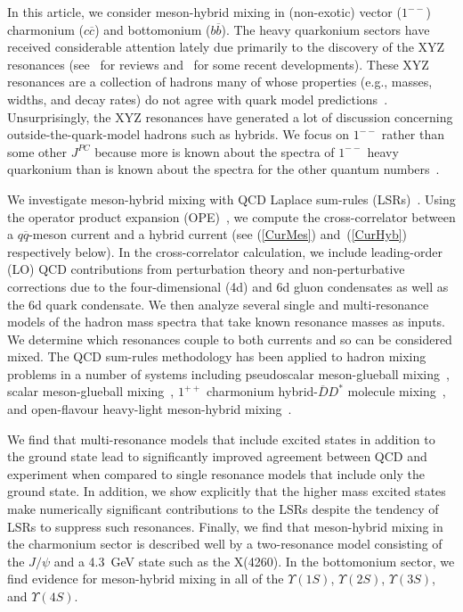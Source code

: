 \documentclass[11pt, letterpaper]{article}
\begin{document}
In this article, we consider meson-hybrid mixing in (non-exotic) vector 
($1^{--}$) charmonium ($c\overline{c}$) and bottomonium ($b\overline{b}$).
The heavy quarkonium sectors have received considerable attention lately due 
primarily to the discovery of the XYZ resonances
(see~\cite{Brambilla:2010cs,Eidelman:2012vu} for reviews
and~\cite{BESIII:2016adj} for some recent developments).
These XYZ resonances are a collection of hadrons 
many of whose properties (e.g., masses, widths, and decay rates) do not agree
with quark model predictions~\cite{BarnesCloseSwanson1995}.
Unsurprisingly, the XYZ resonances have generated a lot of discussion concerning 
outside-the-quark-model hadrons such as hybrids.
We focus on $1^{--}$ rather than some other $J^{PC}$ because more is known 
about the spectra of $1^{--}$ heavy quarkonium than is known about the spectra 
for the other quantum numbers~\cite{Olive:2016xmw}.

We investigate meson-hybrid mixing with QCD Laplace sum-rules 
(LSRs)~\cite{Shifman:1978bx,Shifman:1978by,Reinders:1984sr,narisonbook:2004}.
Using the operator product expansion (OPE)~\cite{Wilson:1969zs}, 
we compute the cross-correlator between a $q\overline{q}$-meson current and a hybrid current
(see (\ref{CurMes}) and~(\ref{CurHyb}) respectively below).
In the cross-correlator calculation, we include leading-order (LO) QCD contributions from perturbation theory and non-perturbative 
corrections due to the four-dimensional (4d) and 6d gluon condensates as well as the 6d quark condensate.
We then analyze several single and multi-resonance models of the hadron mass spectra that take known 
resonance masses as inputs. We determine which resonances couple to 
both currents and so can be considered mixed.
The QCD sum-rules methodology has been applied to hadron mixing problems in
a number of systems including
pseudoscalar meson-glueball mixing~\cite{Narison:1984bv},
scalar meson-glueball mixing~\cite{Harnett:2008cw},
$1^{++}$ charmonium hybrid-$\overline{D}D^{*}$ molecule mixing~\cite{Chen:2013pya}, 
and open-flavour heavy-light meson-hybrid mixing~\cite{ho:2017}.

We find that multi-resonance models that include excited states in addition to 
the ground state lead to significantly improved agreement between QCD and experiment 
when compared to single resonance models that include only the ground state. 
In addition, we show explicitly that the higher mass excited states make numerically significant contributions to the LSRs despite the tendency of LSRs to suppress such resonances.
Finally, we find that meson-hybrid mixing in the charmonium sector is described well 
by a two-resonance model consisting of the
$J/\psi$ and a 4.3~GeV state such as the X(4260).
In the bottomonium sector, we find evidence for meson-hybrid mixing in all of the
$\Upsilon(1S)$, $\Upsilon(2S)$, $\Upsilon(3S)$, and $\Upsilon(4S)$.
\end{document}
